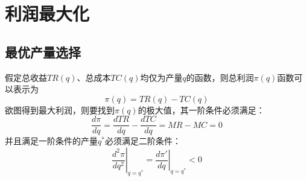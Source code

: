 \chapter{利润最大化}
\label{sec:profit-maximization}

\section{最优产量选择}
假定总收益$TR(q)$、总成本$TC(q)$均仅为产量$q$的函数，则总利润$\pi(q)$函数可以表示为
\[
\pi (q) = TR(q) - TC(q)
\]
欲图得到最大利润，则要找到$\pi(q)$的极大值，其一阶条件必须满足：
\[
\frac{{d\pi}}{{dq}}= \frac{{dTR}}{{dq}} - \frac{{dTC}}{{dq}}= MR - MC = 0
\]
并且满足一阶条件的产量$q^*$必须满足二阶条件：
\[
{\left. {\frac{{{d^2}\pi }}{{d{q^2}}}} \right|_{q = q^*}} = {\left. {\frac{{d\pi '}}{{dq}}} \right|_{q = q^*}} < 0
\]


